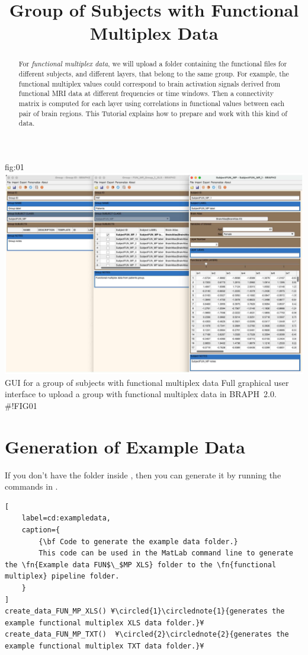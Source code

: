 \documentclass[justified]{tufte-handout}
\title{Group of Subjects with Functional Multiplex Data}
\begin{document}
\maketitle

\begin{abstract}
\noindent
For \emph{functional multiplex data}, we will upload a folder containing the functional files for different subjects, and different layers, that belong to the same group. For example, the functional multiplex values could correspond to brain activation signals derived from functional MRI data at different frequencies or time windows.  Then a connectivity matrix is computed for each layer using correlations in functional values between each pair of brain regions. This Tutorial explains how to prepare and work with this kind of data.
\end{abstract}

\tableofcontents

	{fig:01}
	{\includegraphics{fig01.jpg}}
	{GUI for a group of subjects with functional multiplex data}
	{
	Full graphical user interface to upload a group with functional multiplex data in BRAPH~2.0. 
	}
#!FIG01

\clearpage
\section{Generation of Example Data}

If you don't have the  folder inside , then you can generate it by running the commands in .

\begin{lstlisting}[
	label=cd:exampledata,
	caption={
		{\bf Code to generate the example data folder.}
		This code can be used in the MatLab command line to generate the \fn{Example data FUN$\_$MP XLS} folder to the \fn{functional multiplex} pipeline folder.
	}
]
create_data_FUN_MP_XLS() ¥\circled{1}\circlednote{1}{generates the example functional multiplex XLS data folder.}¥
create_data_FUN_MP_TXT()  ¥\circled{2}\circlednote{2}{generates the example functional multiplex TXT data folder.}¥
\end{lstlisting}
\end{document}
